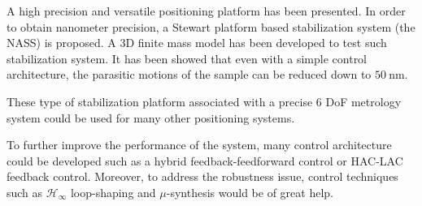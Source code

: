 A high precision and versatile positioning platform has been presented.
In order to obtain nanometer precision, a Stewart platform based stabilization system (the NASS) is proposed.
A 3D finite mass model has been developed to test such stabilization system. It has been showed that even with a simple control architecture, the parasitic motions of the sample can be reduced down to \(\SI{50}{\nano\metre}\).

These type of stabilization platform associated with a precise 6 DoF metrology system could be used for many other positioning systems.

To further improve the performance of the system, many control architecture could be developed such as a hybrid feedback-feedforward control or HAC-LAC feedback control. Moreover, to address the robustness issue, control techniques such as \(\mathcal{H}_\infty\) loop-shaping and \(\mu\)-synthesis would be of great help.

